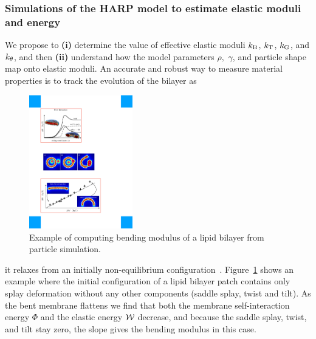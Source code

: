 \subsubsection{Simulations of the HARP model to estimate elastic moduli and energy}
We propose to
%
%
%
{\bf (i)} determine the value of effective elastic moduli $k_{\mathrm{B}}$,
$k_{\mathrm{T}}$, $k_{\mathrm{G}}$, and $k_{\theta}$, and then {\bf (ii)} understand how the model parameters $\rho,$ $\gamma$, and
particle shape map onto elastic moduli. 
An accurate and robust way to measure material properties is to track the evolution of the bilayer as
%
\begin{figure}
\vspace{-0.3cm}
\centerline{\includegraphics[width=0.4\textwidth]{Figures/Flattening.pdf}}
\vspace{-0.2cm}
\caption{\label{fig:flattening} \footnotesize Example of computing
  bending modulus of a lipid bilayer from particle simulation.}
\end{figure}
it relaxes from an initially non-equilibrium
configuration~\cite{PhysRevLett.117.188102}. Figure~\ref{fig:flattening}
shows an example where the initial configuration of a lipid bilayer
patch contains only splay deformation without any other components
(saddle splay, twist and tilt). As the bent membrane flattens we find
that both the membrane self-interaction energy $\Phi$ and the elastic
energy ${\cal W}$ decrease, and because the saddle splay, twist, and
tilt stay zero, the slope gives the bending modulus in this case. 


